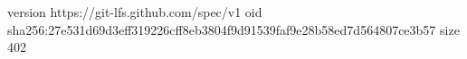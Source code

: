version https://git-lfs.github.com/spec/v1
oid sha256:27e531d69d3eff319226cff8eb3804f9d91539faf9e28b58ed7d564807ce3b57
size 402
